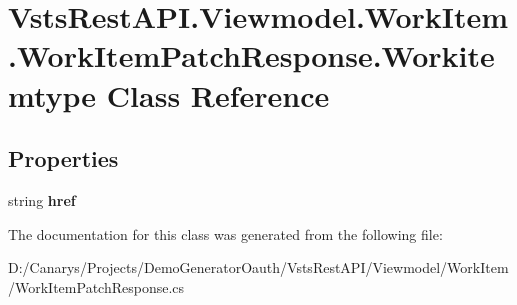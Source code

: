 \hypertarget{class_vsts_rest_a_p_i_1_1_viewmodel_1_1_work_item_1_1_work_item_patch_response_1_1_workitemtype}{}\section{Vsts\+Rest\+A\+P\+I.\+Viewmodel.\+Work\+Item.\+Work\+Item\+Patch\+Response.\+Workitemtype Class Reference}
\label{class_vsts_rest_a_p_i_1_1_viewmodel_1_1_work_item_1_1_work_item_patch_response_1_1_workitemtype}
\subsection*{Properties}
\begin{DoxyCompactItemize}
\item 
\mbox{\label{class_vsts_rest_a_p_i_1_1_viewmodel_1_1_work_item_1_1_work_item_patch_response_1_1_workitemtype_ac3f2657043e8ada951c3787f892ab6e0}} 
string {\bfseries href}
\end{DoxyCompactItemize}


The documentation for this class was generated from the following file\+:\begin{DoxyCompactItemize}
\item 
D\+:/\+Canarys/\+Projects/\+Demo\+Generator\+Oauth/\+Vsts\+Rest\+A\+P\+I/\+Viewmodel/\+Work\+Item/Work\+Item\+Patch\+Response.\+cs\end{DoxyCompactItemize}
